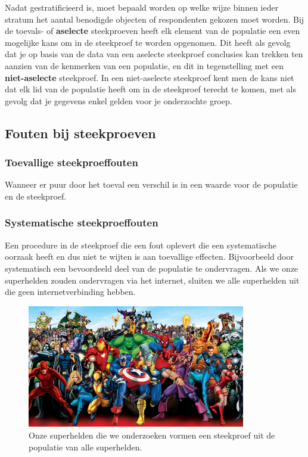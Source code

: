 Nadat gestratificieerd is, moet bepaald worden op welke wijze binnen ieder stratum het aantal benodigde objecten of respondenten gekozen moet worden. Bij de toevals- of \textbf{aselecte}  steekproeven heeft elk element van de populatie een even mogelijke kans om in de steekproef te worden opgenomen. Dit heeft als gevolg dat je op basis van de data van een aselecte steekproef conclusies kan trekken ten aanzien van de kenmerken van een populatie, en dit in tegenstelling met een \textbf{niet-aselecte} steekproef. In een niet-aselecte steekproef kent men de kans niet dat elk lid van de populatie heeft om in de steekproef terecht te komen, met als gevolg dat je gegevens enkel gelden voor je onderzochte groep.

\subsection{Fouten bij steekproeven}
\subsubsection{Toevallige steekproeffouten}
Wanneer er puur door het toeval een verschil is in een waarde voor de populatie en de steekproef.

\subsubsection{Systematische steekproeffouten}
Een procedure in de steekproef die een fout oplevert die een systematische oorzaak heeft en dus niet te wijten is aan toevallige effecten. Bijvoorbeeld door systematisch een bevoordeeld deel van de populatie te ondervragen. Als we onze superhelden zouden ondervragen via het internet, sluiten we alle superhelden uit die geen internetverbinding hebben.

\begin{figure}[t]
  \centering
    \includegraphics[width=0.85\textwidth]{images/les5-heroes.jpg}
  \caption{Onze superhelden die we onderzoeken vormen een steekproef uit de populatie van alle superhelden.}
  \label{fig:populatieHelden}
\end{figure}

